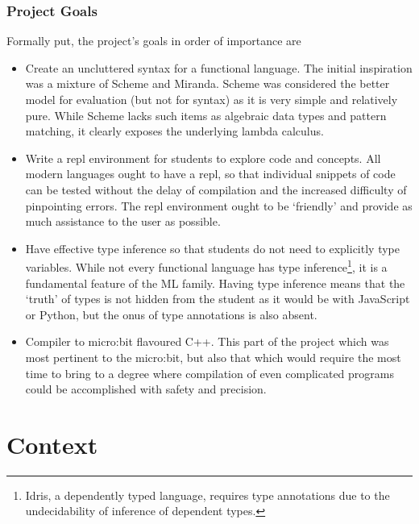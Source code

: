 \documentclass[12pt, a4paper]{report}
\begin{document}
\subsection{Project Goals}
Formally put, the project's goals in order of importance are 

\begin{itemize}
    \item Create an uncluttered syntax for a functional language. The initial inspiration was a
        mixture of Scheme and Miranda. Scheme was considered the better model for evaluation (but
        not for syntax) as it is very simple and relatively pure. While Scheme lacks such items as algebraic data types
        and pattern matching, it clearly exposes the underlying lambda calculus.
    \item Write a repl environment for students to explore code and concepts. All modern languages
        ought to have a repl, so that individual snippets of code can be tested without the delay of
        compilation and the increased difficulty of pinpointing errors. The repl environment ought
        to be `friendly' and provide as much assistance to the user as possible. 
    \item Have effective type inference so that students do not need to explicitly type variables.
        While not every functional language has type inference\footnote{Idris, a dependently typed language,
            requires type annotations due to the undecidability of inference of dependent types.},
        it is a fundamental feature of the ML family. Having type inference means that the `truth'
        of types is not hidden from the student as it would be with JavaScript or Python, but the
        onus of type annotations is also absent.
    \item Compiler to micro:bit flavoured C++. This part of the project which was most
        pertinent to the micro:bit, but also that which would require the most time to bring to a
        degree where compilation of even complicated programs could be accomplished with safety and
        precision. 
\end{itemize}

\chapter{Context} 
\end{document}
